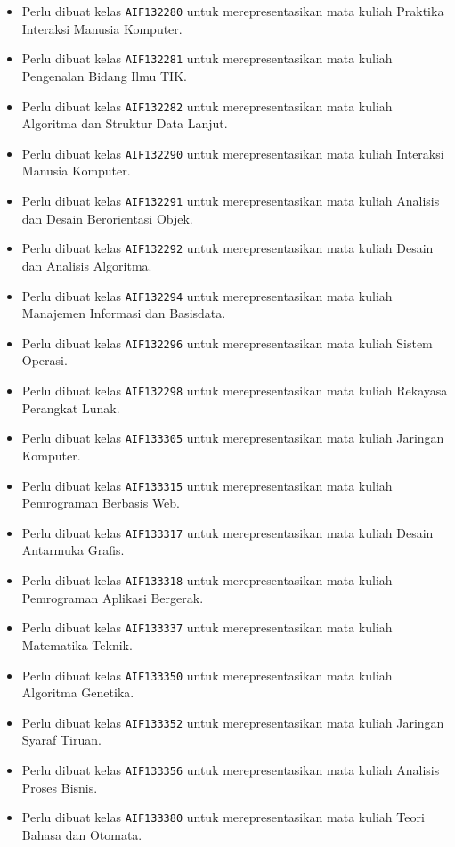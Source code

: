 \begin{enumerate}
\begin{itemize}
		\item Perlu dibuat kelas \texttt{AIF132280} untuk merepresentasikan mata kuliah Praktika Interaksi Manusia Komputer.
		\item Perlu dibuat kelas \texttt{AIF132281} untuk merepresentasikan mata kuliah Pengenalan Bidang Ilmu TIK.
		\item Perlu dibuat kelas \texttt{AIF132282} untuk merepresentasikan mata kuliah Algoritma dan Struktur Data Lanjut.
		\item Perlu dibuat kelas \texttt{AIF132290} untuk merepresentasikan mata kuliah Interaksi Manusia Komputer.
		\item Perlu dibuat kelas \texttt{AIF132291} untuk merepresentasikan mata kuliah Analisis dan Desain Berorientasi Objek.
		\item Perlu dibuat kelas \texttt{AIF132292} untuk merepresentasikan mata kuliah Desain dan Analisis Algoritma.
		\item Perlu dibuat kelas \texttt{AIF132294} untuk merepresentasikan mata kuliah Manajemen Informasi dan Basisdata.
		\item Perlu dibuat kelas \texttt{AIF132296} untuk merepresentasikan mata kuliah Sistem Operasi.
		\item Perlu dibuat kelas \texttt{AIF132298} untuk merepresentasikan mata kuliah Rekayasa Perangkat Lunak.
		\item Perlu dibuat kelas \texttt{AIF133305} untuk merepresentasikan mata kuliah Jaringan Komputer.
		\item Perlu dibuat kelas \texttt{AIF133315} untuk merepresentasikan mata kuliah Pemrograman Berbasis Web.
		\item Perlu dibuat kelas \texttt{AIF133317} untuk merepresentasikan mata kuliah Desain Antarmuka Grafis.
		\item Perlu dibuat kelas \texttt{AIF133318} untuk merepresentasikan mata kuliah Pemrograman Aplikasi Bergerak.
		\item Perlu dibuat kelas \texttt{AIF133337} untuk merepresentasikan mata kuliah Matematika Teknik.
		\item Perlu dibuat kelas \texttt{AIF133350} untuk merepresentasikan mata kuliah Algoritma Genetika.
		\item Perlu dibuat kelas \texttt{AIF133352} untuk merepresentasikan mata kuliah Jaringan Syaraf Tiruan.
		\item Perlu dibuat kelas \texttt{AIF133356} untuk merepresentasikan mata kuliah Analisis Proses Bisnis.
		\item Perlu dibuat kelas \texttt{AIF133380} untuk merepresentasikan mata kuliah Teori Bahasa dan Otomata.

\end{itemize}
\end{enumerate}
